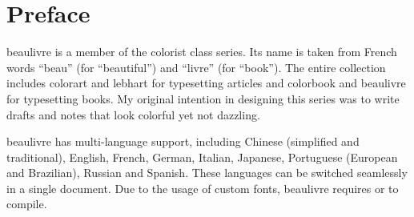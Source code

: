 \documentclass[allowbf,puretext]{beaulivre}
\theoremstyle{basic}
\theoremstyle{emphasis}
\theoremstyle{simple}
\providecommand{\colorist}{{\normalfont\textsf{colorist}}}
\providecommand{\colorart}{{\normalfont\textsf{colorart}}}
\providecommand{\colorbook}{{\normalfont\textsf{colorbook}}}
\providecommand{\lebhart}{{\normalfont\textsf{lebhart}}}
\providecommand{\beaulivre}{{\normalfont\textsf{beaulivre}}}
\begin{document}


\frontmatter

\begin{titlepage} %
%
\end{titlepage}%
\cleardoublepage%

\frontmatter
\chapter*{Preface}

\beaulivre{} is a member of the \colorist{} class series. Its name is taken from French words ``beau'' (for ``beautiful'') and ``livre'' (for ``book''). The entire collection includes \colorart{} and \lebhart{} for typesetting articles and \colorbook{} and \beaulivre{} for typesetting books. My original intention in designing this series was to write drafts and notes that look colorful yet not dazzling.

\beaulivre{} has multi-language support, including Chinese (simplified and traditional), English, French, German, Italian, Japanese, Portuguese (European and Brazilian), Russian and Spanish. These languages can be switched seamlessly in a single document. Due to the usage of custom fonts, \beaulivre{} requires  or  to compile.
\end{document}
